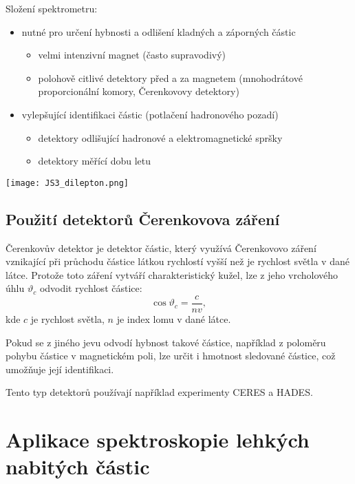 \documentclass[../../main.tex]{subfiles}
\begin{document}
Složení spektrometru:
\begin{itemize}
	\item nutné pro určení hybnosti a odlišení kladných a záporných částic
	\begin{itemize}
		\item velmi intenzivní magnet (často supravodivý)
		\item polohově citlivé detektory před a za magnetem (mnohodrátové proporcionální komory, Čerenkovovy detektory)
	\end{itemize}
	\item vylepšující identifikaci částic (potlačení hadronového pozadí)
	\begin{itemize}
		\item detektory odlišující hadronové a elektromagnetické spršky
		\item detektory měřící dobu letu
	\end{itemize}
\end{itemize}

\begin{center}
	\texttt{[image: JS3\_dilepton.png]}
\end{center}


\subsection{Použití detektorů Čerenkovova záření}

Čerenkovův detektor je detektor částic, který využívá Čerenkovovo záření vznikající při průchodu částice látkou rychlostí vyšší než je rychlost světla v dané látce. Protože toto záření vytváří charakteristický kužel, lze z jeho vrcholového úhlu $ \vartheta _{c}$ odvodit rychlost částice:
\begin{equation}
\cos \vartheta_c = \dfrac{c}{nv},
\end{equation}
kde $c$ je rychlost světla, $n$ je index lomu v dané látce.

Pokud se z jiného jevu odvodí hybnost takové částice, například z poloměru pohybu částice v magnetickém poli, lze určit i hmotnost sledované částice, což umožňuje její identifikaci.

Tento typ detektorů používají například experimenty CERES a HADES. 

	
\section{Aplikace spektroskopie lehkých nabitých částic}
\end{document}
